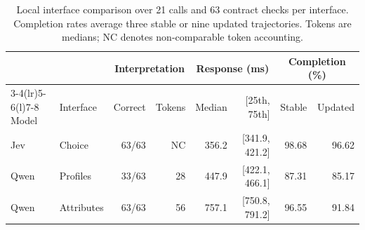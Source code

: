 \begin{table}[t]
\centering
\caption{Local interface comparison over 21 calls and 63 contract checks per interface. Completion rates average three stable or nine updated trajectories. Tokens are medians; NC denotes non-comparable token accounting.}
\label{tab:interface}
\footnotesize\setlength{\tabcolsep}{5pt}\renewcommand{\arraystretch}{1.15}
\begin{tabular}{@{}llrrrrrr@{}}\toprule
& & \multicolumn{2}{c}{Interpretation} & \multicolumn{2}{c}{Response (ms)} & \multicolumn{2}{c}{Completion (\%)}\\
\cmidrule(lr){3-4}\cmidrule(lr){5-6}\cmidrule(l){7-8}
\rowcolor{TableHeaderShade}
Model & Interface & Correct & Tokens & Median & [25th, 75th] & Stable & Updated\\\midrule
Jev & Choice & 63/63 & NC & 356.2 & [341.9, 421.2] & 98.68 & 96.62\\
Qwen & Profiles & 33/63 & 28 & 447.9 & [422.1, 466.1] & 87.31 & 85.17\\
Qwen & Attributes & 63/63 & 56 & 757.1 & [750.8, 791.2] & 96.55 & 91.84\\
\bottomrule\end{tabular}\end{table}
